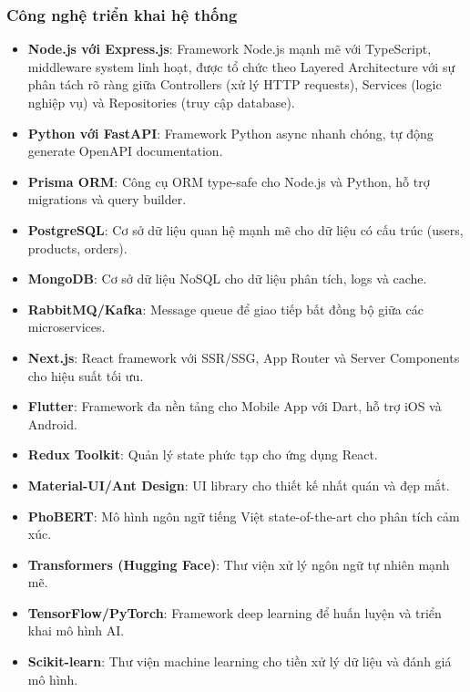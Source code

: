 \subsubsection{Công nghệ triển khai hệ thống}
\begin{itemize}
    \item \textbf{Node.js với Express.js}: Framework Node.js mạnh mẽ với TypeScript, middleware system linh hoạt, được tổ chức theo Layered Architecture với sự phân tách rõ ràng giữa Controllers (xử lý HTTP requests), Services (logic nghiệp vụ) và Repositories (truy cập database).
    \item \textbf{Python với FastAPI}: Framework Python async nhanh chóng, tự động generate OpenAPI documentation.
    \item \textbf{Prisma ORM}: Công cụ ORM type-safe cho Node.js và Python, hỗ trợ migrations và query builder.
    \item \textbf{PostgreSQL}: Cơ sở dữ liệu quan hệ mạnh mẽ cho dữ liệu có cấu trúc (users, products, orders).
    \item \textbf{MongoDB}: Cơ sở dữ liệu NoSQL cho dữ liệu phân tích, logs và cache.
    \item \textbf{RabbitMQ/Kafka}: Message queue để giao tiếp bất đồng bộ giữa các microservices.
\end{itemize}

\begin{itemize}
    \item \textbf{Next.js}: React framework với SSR/SSG, App Router và Server Components cho hiệu suất tối ưu.
    \item \textbf{Flutter}: Framework đa nền tảng cho Mobile App với Dart, hỗ trợ iOS và Android.
    \item \textbf{Redux Toolkit}: Quản lý state phức tạp cho ứng dụng React.
    \item \textbf{Material-UI/Ant Design}: UI library cho thiết kế nhất quán và đẹp mắt.
\end{itemize}

\begin{itemize}
    \item \textbf{PhoBERT}: Mô hình ngôn ngữ tiếng Việt state-of-the-art cho phân tích cảm xúc.
    \item \textbf{Transformers (Hugging Face)}: Thư viện xử lý ngôn ngữ tự nhiên mạnh mẽ.
    \item \textbf{TensorFlow/PyTorch}: Framework deep learning để huấn luyện và triển khai mô hình AI.
    \item \textbf{Scikit-learn}: Thư viện machine learning cho tiền xử lý dữ liệu và đánh giá mô hình.
\end{itemize}

